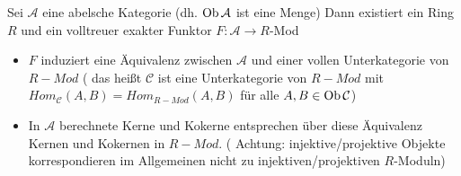 \begin{sa}\label{5.35}
	Sei $\mathcal{A} $ eine abelsche Kategorie (dh. $\text{Ob}\,\mathcal{A}$ ist eine Menge) Dann existiert ein Ring $R$ und ein volltreuer exakter Funktor $F: \mathcal{A} \to R$-Mod 
\end{sa}
\begin{anm}
	\begin{itemize}
		\item $F$ induziert eine Äquivalenz zwischen $\mathcal{A}$ und einer vollen Unterkategorie von $R-Mod $ ( das heißt $\mathcal{C} $ ist eine Unterkategorie von $R-Mod $ mit $ Hom_{\mathcal{C}}(A,B)= Hom_{R-Mod}(A,B) $ für alle $ A,B \in \text{Ob}\,\mathcal{C}$)
		\item In $\mathcal{A} $ berechnete Kerne und Kokerne entsprechen über diese Äquivalenz Kernen und Kokernen in $R-Mod$. ( Achtung: injektive/projektive Objekte korrespondieren im Allgemeinen nicht zu injektiven/projektiven $R$-Moduln)
	\end{itemize}
\end{anm}
\newpage 
